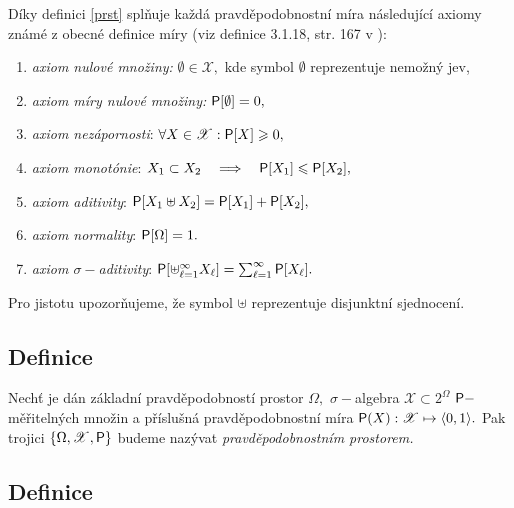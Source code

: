 D\'iky definici \ref{prst} spl\v nuje ka\v zd\'a pravděpodobnostn\'i m\'ira n\'asleduj\'ic\'i axiomy zn\'am\'e z obecn\'e definice m\'iry (viz definice 3.1.18, str. 167 v \cite{Krbalek_MAB4}):
\begin{enumerate}
    \item \emph{axiom nulov\'e mno\v ziny:} $\emptyset \in \mathscr{X},$ kde symbol $\emptyset$ reprezentuje nemo\v zn\'y jev,
    \item \emph{axiom m\'iry nulov\'e mno\v ziny:} $\mbox{\sf P}[\emptyset]=0,$
    \item \emph{axiom nezápornosti}: $\forall X \in \mathscr{X}: \mbox{\sf P}[X]\geqslant 0,$
    \item \emph{axiom monotónie}: $X_1 \subset X_2 \quad \Longrightarrow  \quad \mbox{\sf P}[X_1] \leqslant \mbox{\sf P}[X_2],$
    \item \emph{axiom aditivity}: $\mbox{\sf P}[X_1 \uplus X_2] = \mbox{\sf P}[X_1]+\mbox{\sf P}[X_2],$
    \item \emph{axiom normality}: $\mbox{\sf P}[\Omega]=1.$
    \item \emph{axiom $\sigma-$aditivity}: $\mbox{\sf P}[\uplus_{\ell=1}^\infty X_\ell]=\sum_{\ell=1}^\infty \mbox{\sf P}[X_\ell].$
\end{enumerate}
%
Pro jistotu upozor\v nujeme, \v ze symbol $\uplus$ reprezentuje disjunktn\'i sjednocen\'i.


\subsection{Definice}

Nech\v t je d\'an z\'akladn\'i pravd\v epodobnost\'i prostor $\Omega,$ $\sigma-$algebra
$\mathscr{X}\subset 2^{\Omega}$ $\mbox{\sf P}-$m\v e\v riteln\'ych mno\v zin a p\v r\'islu\v sn\'a pravd\v epodobnostn\'i m\'ira $\mbox{\sf P}(X): \mathscr{X} \mapsto \langle 0, 1\rangle.$ Pak trojici $\{\Omega,\mathscr{X},\mbox{\sf P}\}$ budeme naz\'yvat \emph{pravd\v epodobnostn\'im prostorem.}


\subsection{Definice}

